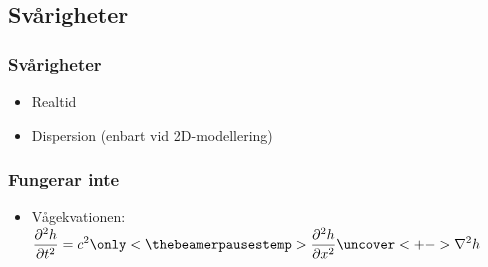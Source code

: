 
\subsection{Svårigheter}

\begin{frame}
\frametitle{Svårigheter}

\begin{itemize}[<+(1)->]
\item Realtid
\item Dispersion (enbart vid 2D-modellering)
\end{itemize}
\end{frame}

\begin{frame}
\frametitle{Fungerar inte}

\setcounter{beamerpausestemp}{\thebeamerpauses}

\begin{itemize}[<+->]
\item Vågekvationen:
$\displaystyle \frac{\partial^2 h}{\partial t^2} = c^2\only<\thebeamerpausestemp>{\frac{\partial^2 h}{\partial x^2}}\uncover<+->{\nabla^2h}$
\end{itemize}
\end{frame}